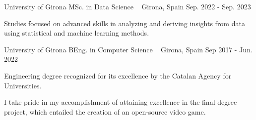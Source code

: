 

\begin{cventries}

  \cventry
    {University of Girona} %
    {MSc. in Data Science \ \href{https://1drv.ms/b/s!AkpkVWgTjVvhg75Ia949k6hMR4yAdQ?e=RifsPu}{{\scriptsize \faPaperclip}}} %
    {Girona, Spain} %
    {Sep. 2022 - Sep. 2023} %
    {
      \begin{cvitems} %
      \item {
      Studies focused on advanced skills in analyzing and deriving insights from data using statistical and machine learning methods.
      }
      \end{cvitems}
    }

    \cventry
    {University of Girona} %
    {BEng. in Computer Science \ \href{https://1drv.ms/b/s!AkpkVWgTjVvhg74LnMHf7OWtWJlmrg?e=gcWA80}{{\scriptsize \faPaperclip}}} %
    {Girona, Spain} %
    {Sep 2017 - Jun. 2022} %
    {
      \begin{cvitems} %
        \item {Engineering degree recognized for its excellence by the Catalan Agency for Universities.}
        \item {I take pride in my accomplishment of attaining excellence in the final degree project, which entailed the creation of an open-source video game.
}
      \end{cvitems}
    }

\end{cventries}

